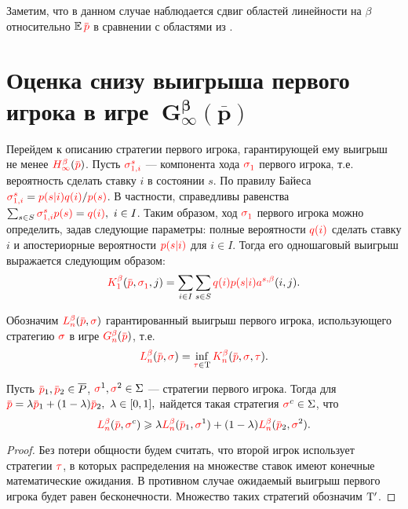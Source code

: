 {Заметим, что в данном случае наблюдается сдвиг областей линейности на $\beta$ относительно $\E \pd$ в сравнении с областями из \cite{domansky11}.

\section{Оценка снизу выигрыша первого игрока в игре~$\mathbf{G^\beta_\infty(\overline{p})}$}
\label{ch2:sec:lower-bound}

Перейдем к описанию стратегии первого игрока, гарантирующей ему выигрыш не менее $\H{\infty}(\pd)$.
Пусть $\sigmasc[s]{i}$ --- компонента хода $\sigmas{1}$ первого игрока, т.е. вероятность сделать ставку $i$ в состоянии $s$.
По правилу Байеса $\sigmasc[s]{i} = \pac{s}{i} \qc{i} / \pc{s}$.
В частности, справедливы равенства $\sum_{s \in S} \sigmasc[s]{i} \pc{s} = \qc{i},\ i \in I$.
Таким образом, ход $\sigmas{1}$ первого игрока можно определить, задав следующие параметры: полные вероятности $\textcolor{red}{q(i)}$ сделать ставку $i$ и апостериорные вероятности $\textcolor{red}{p(s|i)}$ для $i \in I$.
Тогда его одношаговый выигрыш выражается следующим образом:
\begin{equation}
  \label{ch2:lower-bound:eq:K1(q,pi)}
  \K{1}(\pd, \sigmas{1}, j) = \sum_{i \in I} \sum_{s \in S} \qc{i} \pac{s}{i} \as(i, j).
\end{equation}

Обозначим $\L{n}(\pd, \sigmar)$ гарантированный выигрыш первого игрока, использующего стратегию $\textcolor{red}{\sigma}$ в игре $\theG{n}(\pd)$, т.е.
\[
  \L{n}(\pd, \sigmar) = \inf_{\taur \in \Tau} \K{n}(\pd, \sigmar, \taur).
\]

\begin{lemma}
  \label{ch2:lower-bound:lemma:convex-combination}
  Пусть $\pd_1, \pd_2 \in \PM$, $\textcolor{red}{\sigma}^1, \textcolor{red}{\sigma}^2 \in \Sigma$ --- стратегии первого игрока.
  Тогда для $\pd = \lambda \pd_1 + (1-\lambda) \pd_2,\ \lambda \in [0, 1],$ найдется такая стратегия $\textcolor{red}{\sigma}^c \in \Sigma$, что
  \[
    \L{n}(\pd, \sigmar^c) \geqslant
    \lambda \L{n}(\pd_1, \sigmar^1) + (1-\lambda) \L{n}(\pd_2, \sigmar^2).
  \]
\end{lemma}
\begin{proof}
  Без потери общности будем считать, что второй игрок использует стратегии $\textcolor{red}{\tau}$, в которых распределения на множестве ставок имеют конечные математические ожидания.
  В противном случае ожидаемый выигрыш первого игрока будет равен бесконечности.
  Множество таких стратегий обозначим $\mathrm{T}'$.
  

\end{proof}}
